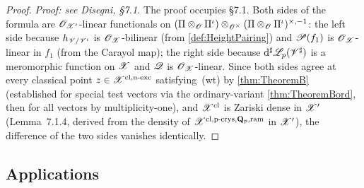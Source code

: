 \begin{proof}
  \textit{Proof: see Disegni, §7.1.}
  The proof occupies §7.1.  Both sides of the formula are
  $\mathscr{O}_{\mathscr{X}'}$-linear functionals on
  $(\Pi \otimes_{\mathscr{O}} \Pi^\iota) \otimes_{\mathscr{O}^\times} (\Pi \otimes_{\mathscr{O}}
  \Pi^\iota)^{\times,-1}$: the left side because $h_{\mathscr{V}/\mathscr{V}^\iota}$ is
  $\mathscr{O}_{\mathscr{X}}$-bilinear (from \cref{def:HeightPairing}) and $\mathscr{P}(f_1)$ is
  $\mathscr{O}_{\mathscr{X}}$-linear in $f_1$ (from the Carayol map); the right side
  because $\mathrm{d}^\sharp\mathscr{L}_p(\mathscr{V}^\sharp)$ is a meromorphic function on $\mathscr{X}$ and
  $\mathscr{Q}$ is $\mathscr{O}_{\mathscr{X}}$-linear.  Since both sides agree at every classical
  point $z \in \mathscr{X}^{\mathrm{cl,n\text{-}exc}}$ satisfying~(wt) by
  \cref{thm:TheoremB} (established for special test vectors via the
  ordinary-variant \cref{thm:TheoremBord}, then for all vectors by
  multiplicity-one), and $\mathscr{X}^{\mathrm{cl}}$ is Zariski dense in $\mathscr{X}'$
  (Lemma~7.1.4, derived from the density of $\mathscr{X}^{\mathrm{cl,p\text{-}crys,}\mathbf{Q}_p,\mathrm{ram}}$
  in $\mathscr{X}'$), the difference of the two sides vanishes identically.
\end{proof}

\subsection{Applications}

